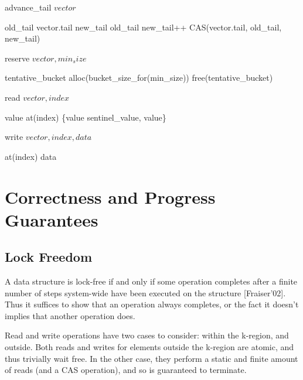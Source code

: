 \documentclass{sigplanconf}
\begin{document}
\begin{algorithm}
\caption{advance\_tail $vector$}
\begin{algorithmic}
\STATE old\_tail \as vector.tail
\STATE new\_tail \as old\_tail
  \STATE new\_tail++
\ENDWHILE
\STATE CAS(vector.tail, old\_tail, new\_tail)
\end{algorithmic}
\label{alg:advancetail}
\end{algorithm}

\begin{algorithm}
\caption{reserve $vector, min_size$}
\begin{algorithmic}
  \STATE tentative\_bucket \as alloc(bucket\_size\_for(min\_size))
    \STATE free(tentative\_bucket)
  \ENDIF
\ENDIF
\end{algorithmic}
\label{alg:reserve}
\end{algorithm}

\begin{algorithm}
\caption{read $vector, index$}
\begin{algorithmic}
\STATE value \as at(index)
\RETURN \{value \eq sentinel\_value, value\}
\end{algorithmic}
\end{algorithm}

\begin{algorithm}
\caption{write $vector, index, data$}
\begin{algorithmic}
\STATE at(index) \as data
\end{algorithmic}
\end{algorithm}




\section{Correctness and Progress Guarantees}
\subsection{Lock Freedom}
A data structure is lock-free if and only if some operation completes
after a finite number of steps system-wide have been executed on the
structure [Fraiser'02]. Thus it suffices to show that an operation
always completes, or the fact it doesn't implies that another operation does.

Read and write operations have two cases to consider: within the k-region,
and outside. Both reads and writes for elements outside the k-region are
atomic, and thus trivially wait free. In the other case, they perform a static and finite amount of reads (and a CAS operation), and so is guaranteed to terminate.
\end{document}
